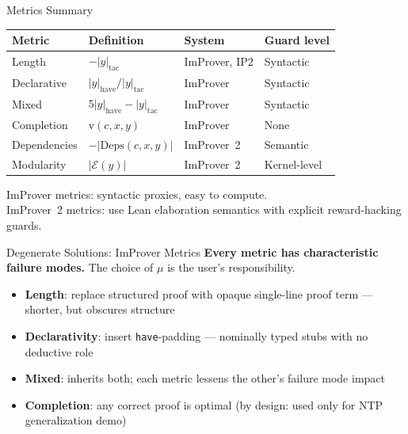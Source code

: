 \documentclass{beamer}
\begin{document}
\begin{frame}{Metrics Summary}
\vspace{0.3em}
\begin{center}
\begin{tabular}{llll}
\toprule
\textbf{Metric} & \textbf{Definition} & \textbf{System} & \textbf{Guard level}\\
\midrule
Length       & $-|y|_{\mathrm{tac}}$                              & ImProver, IP2 & Syntactic\\
Declarative  & $|y|_{\mathrm{have}} / |y|_{\mathrm{tac}}$         & ImProver      & Syntactic\\
Mixed        & $5|y|_{\mathrm{have}} - |y|_{\mathrm{tac}}$        & ImProver      & Syntactic\\
Completion   & $\mathrm{v}(c,x,y)$                                & ImProver      & None\\
\hdashline
Dependencies & $-|\mathrm{Deps}(c,x,y)|$                          & ImProver~2    & Semantic\\
Modularity   & $|\mathcal{E}(y)|$                                  & ImProver~2    & Kernel-level\\
\bottomrule
\end{tabular}
\end{center}
\vspace{0.5em}
\small ImProver metrics: syntactic proxies, easy to compute.\\
ImProver~2 metrics: use Lean elaboration semantics with explicit reward-hacking guards.
\end{frame}

\begin{frame}{Degenerate Solutions: ImProver Metrics}
\vspace{0.3em}
\textbf{Every metric has characteristic failure modes.} The choice of $\mu$ is the user's responsibility.
\vspace{0.4em}
\begin{itemize}\setlength{\itemsep}{8pt}
  \item \textbf{Length}: replace structured proof with opaque single-line proof term --- shorter, but obscures structure
  \item \textbf{Declarativity}: insert \texttt{have}-padding --- nominally typed stubs with no deductive role
  \item \textbf{Mixed}: inherits both; each metric lessens the other's failure mode impact
  \item \textbf{Completion}: any correct proof is optimal (by design: used only for NTP generalization demo)
\end{itemize}
\end{frame}
\end{document}
